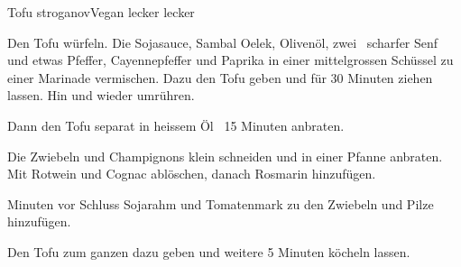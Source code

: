 
\begin{recipe}[]{Tofu stroganov}{Vegan lecker lecker}{}



\step%
Den Tofu w\"urfeln. Die Sojasauce, Sambal Oelek, Oliven\"ol, zwei \TL~scharfer
Senf und etwas Pfeffer, Cayennepfeffer und Paprika in einer mittelgrossen
Sch\"ussel zu einer Marinade vermischen. Dazu den Tofu geben und f\"ur 30
Minuten ziehen lassen. Hin und wieder umr\"uhren.

\step%
Dann den Tofu separat in heissem \"Ol \ca~15 Minuten anbraten.

\step%
Die Zwiebeln und Champignons klein schneiden und in einer Pfanne anbraten. Mit
Rotwein und Cognac abl\"oschen, danach Rosmarin hinzuf\"ugen.

 Minuten vor Schluss Sojarahm und Tomatenmark zu den Zwiebeln und Pilze
hinzuf\"ugen.

\step%
Den Tofu zum ganzen dazu geben und weitere 5 Minuten k\"ocheln lassen.



\end{recipe}

